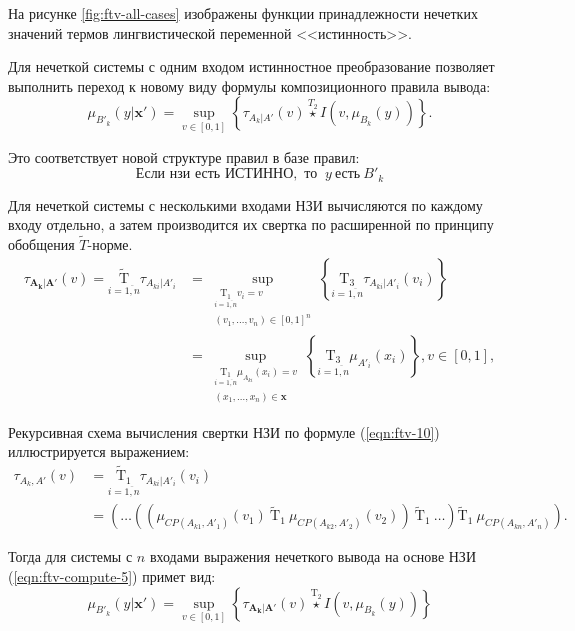 На рисунке \cref{fig:ftv-all-cases} изображены функции принадлежности нечетких значений термов лингвистической переменной <<истинность>>.

Для нечеткой системы с одним входом истинностное преобразование позволяет выполнить переход к новому виду формулы композиционного правила вывода:
\begin{equation}
	\label{eqn:ftv-compute-5}
	\mu_{B'_k}(y|\mathbf{x'}) = \sup_{v \in [0,1]}\left\{\tau_{A_k|A'}(v) \overset{T_2}{\star} I(v, \mu_{B_k}(y))\right\}.
\end{equation}

Это соответствует новой структуре правил в базе правил:
\begin{equation}
	\text{Если } \textit{нзи} \text{ есть } \text{ИСТИННО}, \text{ то }\ y\ \text{есть}\ B'_k
	\label{eqn:ftv-compute-13}
\end{equation}

Для нечеткой системы с несколькими входами НЗИ вычисляются по каждому входу отдельно, а затем производится их свертка по расширенной по принципу обобщения $\tilde{T}$-норме.
\begin{align}
	\label{eqn:ftv-compute-7}
	\tau_{\mathbf{A_k}|\mathbf{A'}}(v) = \underset{i=\overline{1,n}}{\mathrm{\tilde{T}}} \tau_{A_{ki}|A'_i} &= \sup_{\substack{\underset{i=\overline{1,n}}{\mathrm{T_1}}v_i = v \\ (v_1, \dots, v_n) \in [0, 1]^n}} \left\{\underset{i=\overline{1,n}}{\mathrm{T_3}}\tau_{A_{ki}|A'_i}(v_i)\right\} \\ \label{eqn:ftv-10} &= \sup_{\substack{\underset{i=\overline{1,n}}{\mathrm{T_1}}\mu_{A_{ki}}(x_i)=v \\ (x_1, \dots, x_n) \in \mathbf{x}}} \left\{ \underset{i=\overline{1,n}}{\mathrm{T_3}} \mu_{A'_i}(x_i) \right\}, v \in [0, 1],
\end{align}

Рекурсивная схема вычисления свертки НЗИ по формуле (\ref{eqn:ftv-10}) иллюстрируется выражением:
\begin{align*}
	\label{eqn:ftv-compute-10}
	\tau_{A_k, A'}(v) & = \underset{i=\overline{1,n}}{\mathrm{\tilde{T}_1}}\tau_{A_{ki}|A'_i}(v_i) \\
	& = \left(\dots\left(\left(\mu_{CP(A_{k1}, A'_1)}(v_1)\ \mathrm{\tilde{T}_1}\ \mu_{CP(A_{k2}, A'_2)}(v_2)\right)\ \mathrm{\tilde{T}_1}\ \dots \right) \mathrm{\tilde{T}_1}\ \mu_{CP(A_{kn}, A'_n)}\right).
\end{align*}

Тогда для системы с $n$ входами выражения нечеткого вывода на основе НЗИ (\ref{eqn:ftv-compute-5}) примет вид:
\begin{equation}
	\label{eqn:ftv-compute-9}
	\mu_{B'_k}(y|\mathbf{x'}) = \sup_{v \in [0, 1]} \left\{\tau_{\mathbf{A_k}|\mathbf{A'}}(v) \overset{\mathrm{T_2}}{\star} I(v, \mu_{B_k}(y))\right\}
\end{equation}

